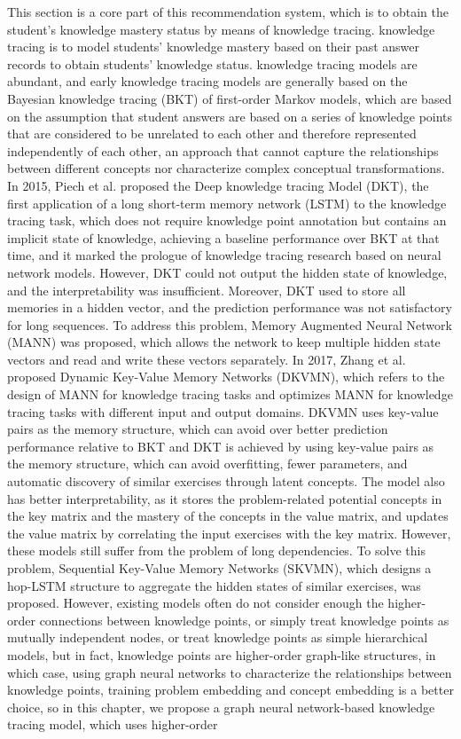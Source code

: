 This section is a core part of this recommendation system, which is to obtain the student's knowledge mastery status by means of knowledge tracing. knowledge tracing is to model students' knowledge mastery based on their past answer records to obtain students' knowledge status. knowledge tracing models are abundant, and early knowledge tracing models are generally based on the Bayesian knowledge tracing (BKT)\cite{yudelson2013individualized} of first-order Markov models, which are based on the assumption that student answers are based on a series of knowledge points that are considered to be unrelated to each other and therefore represented independently of each other, an approach that cannot capture the relationships between different concepts nor characterize complex conceptual transformations. In 2015, Piech et al. proposed the Deep knowledge tracing Model (DKT)\cite{piech2015deep}, the first application of a long short-term memory network (LSTM) to the knowledge tracing task, which does not require knowledge point annotation but contains an implicit state of knowledge, achieving a baseline performance over BKT at that time, and it marked the prologue of knowledge tracing research based on neural network models. However, DKT could not output the hidden state of knowledge, and the interpretability was insufficient. Moreover, DKT used to store all memories in a hidden vector, and the prediction performance was not satisfactory for long sequences. To address this problem, Memory Augmented Neural Network (MANN)\cite{santoro2016meta} was proposed, which allows the network to keep multiple hidden state vectors and read and write these vectors separately. In 2017, Zhang et al. proposed Dynamic Key-Value Memory Networks (DKVMN)\cite{zhang2017dynamic}, which refers to the design of MANN for knowledge tracing tasks and optimizes MANN for knowledge tracing tasks with different input and output domains. DKVMN uses key-value pairs as the memory structure, which can avoid over better prediction performance relative to BKT and DKT is achieved by using key-value pairs as the memory structure, which can avoid overfitting, fewer parameters, and automatic discovery of similar exercises through latent concepts. The model also has better interpretability, as it stores the problem-related potential concepts in the key matrix and the mastery of the concepts in the value matrix, and updates the value matrix by correlating the input exercises with the key matrix. However, these models still suffer from the problem of long dependencies. To solve this problem, Sequential Key-Value Memory Networks (SKVMN)\cite{Abdelrahman_2019}, which designs a hop-LSTM structure to aggregate the hidden states of similar exercises, was proposed. However, existing models often do not consider enough the higher-order connections between knowledge points, or simply treat knowledge points as mutually independent nodes, or treat knowledge points as simple hierarchical models, but in fact, knowledge points are higher-order graph-like structures, in which case, using graph neural networks to characterize the relationships between knowledge points, training problem embedding and concept embedding is a better choice, so in this chapter, we propose a graph neural network-based knowledge tracing model, which uses higher-order 